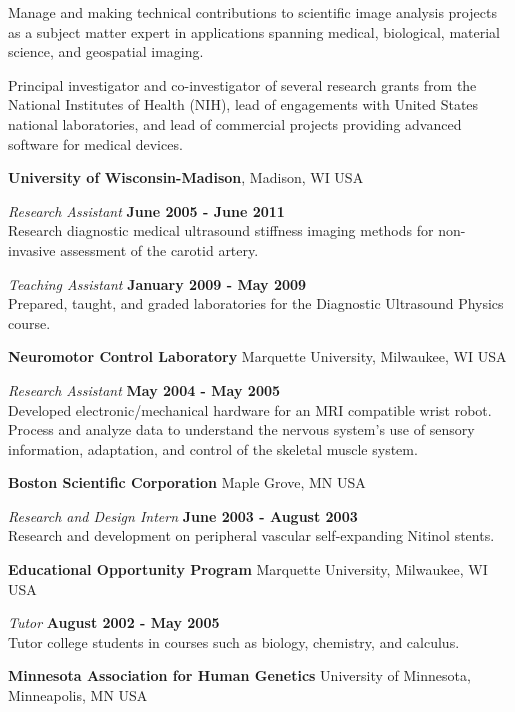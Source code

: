 \documentclass[margin,line]{res}
\begin{document}
\begin{resume}
Manage and making technical contributions to scientific image analysis
projects as a subject matter expert in applications spanning medical, biological,
material science, and geospatial imaging.

Principal investigator and co-investigator of several research grants from
the National Institutes of Health (NIH), lead of engagements with United States
national laboratories, and lead of commercial projects providing advanced software
for medical devices.

{\bf University of Wisconsin-Madison}, Madison, WI USA

\vspace{-.3cm}
{\em Research Assistant} \hfill {\bf June 2005 - June 2011} \\
Research diagnostic medical ultrasound stiffness imaging methods for non-invasive assessment of the carotid artery.

\vspace{-.3cm}
{\em Teaching Assistant} \hfill {\bf January 2009 - May 2009} \\
Prepared, taught, and graded laboratories for the Diagnostic Ultrasound Physics
course.

{\bf Neuromotor Control Laboratory} Marquette University, Milwaukee, WI USA

\vspace{-.3cm}
{\em Research Assistant} \hfill {\bf May 2004 - May 2005} \\
Developed electronic/mechanical hardware for an MRI compatible
wrist robot.
Process and analyze data to understand the nervous system's use of sensory information, adaptation, and control of the skeletal muscle system.

{\bf Boston Scientific Corporation} Maple Grove, MN USA

\vspace{-.3cm}
{\em Research and Design Intern} \hfill {\bf June 2003 - August 2003} \\
Research and development on peripheral vascular self-expanding Nitinol stents.

{\bf Educational Opportunity Program} Marquette University, Milwaukee, WI USA

\vspace{-.3cm}
{\em Tutor} \hfill {\bf August 2002 - May 2005} \\
Tutor college students in courses such as biology, chemistry, and calculus.

{\bf Minnesota Association for Human Genetics} University of Minnesota, Minneapolis, MN USA


\end{resume}
\end{document}
